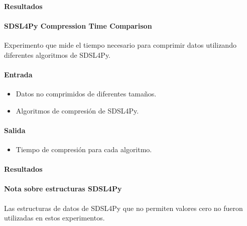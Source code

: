 \paragraph{Resultados}
\vspace{0.5em}
\noindent

\SDSLFourPyCompressionSpaceComparison

\paragraph{SDSL4Py Compression Time Comparison}
\label{sdsl4py_compression_time}

Experimento que mide el tiempo necesario para comprimir datos utilizando diferentes algoritmos de SDSL4Py.

\paragraph{Entrada}
\begin{itemize}
    \item Datos no comprimidos de diferentes tamaños.
    \item Algoritmos de compresión de SDSL4Py.
\end{itemize}

\paragraph{Salida}
\begin{itemize}
    \item Tiempo de compresión para cada algoritmo.
\end{itemize}

\paragraph{Resultados}
\vspace{0.5em}
\noindent

\SDSLFourPyCompressionTimeComparison

\paragraph{Nota sobre estructuras SDSL4Py}
Las estructuras de datos de SDSL4Py que no permiten valores cero no fueron utilizadas en estos experimentos.

